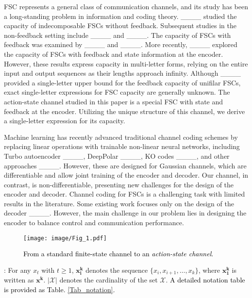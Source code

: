 FSC represents a general class of communication channels, and its study has been a long-standing problem in information and coding theory. \textcolor{black}{____} studied the capacity of indecomposable FSCs without feedback. Subsequent studies in the non-feedback setting include ____ and ____. The capacity of FSCs with feedback was examined by ____ and ____. More recently, ____ explored the capacity of FSCs with feedback and state information at the encoder. However, these results express capacity in multi-letter forms, relying on the entire input and output sequences as their lengths approach infinity.
Although ____ provided a single-letter upper bound for the feedback capacity of unifilar FSCs, exact single-letter expressions for FSC capacity are generally unknown. The action-state channel studied in this paper is a special FSC with state and feedback at the encoder. Utilizing the unique structure of this channel, we derive a single-letter expression for its capacity.

Machine learning has recently advanced traditional channel coding schemes by replacing linear operations with trainable non-linear neural networks, including Turbo autoencoder ____, DeepPolar ____, KO codes ____, and other approaches ____.
However, these are designed for Gaussian channels, which are differentiable and allow joint training of the encoder and decoder. Our channel, in contrast, is non-differentiable, presenting new challenges for the design of the encoder and decoder. Channel coding for FSCs is a challenging task with limited results in the literature. Some existing work focuses only on the design of the decoder ____. However, the main challenge in our problem lies in designing the encoder to balance control and communication performance.


\begin{figure}[t]
    \centering
    \texttt{[image: image/Fig\_1.pdf]}
     \caption{\small\textcolor{black}{{From a standard finite-state channel to an \textit{action-state channel}.}}}
     \label{FSC_fig_1}
     \vspace{-10pt}
\end{figure}

: For any $x_t$ with $t\ge1$, $\bm{x_i^k}$ denotes the sequence $\{x_i,x_{i+1},\ldots,x_{k}\}$, where $\bm{x_1^k}$ is written as $\bm{x^k}$. %
$|\mathcal{X}|$ denotes the cardinality of the set $\mathcal{X}$. \textcolor{black}{A detailed notation table is provided as Table. \ref{Tab_notation}.}